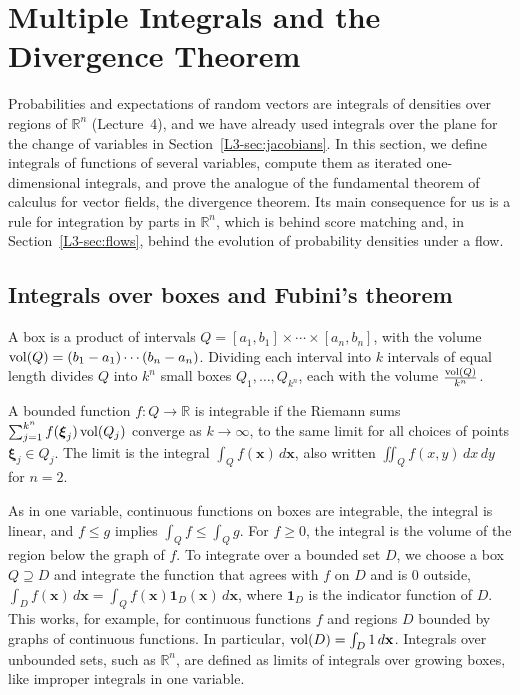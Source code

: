 \section{Multiple Integrals and the Divergence Theorem}\label{L3-sec:integrals}

Probabilities and expectations of random vectors are integrals of densities over regions of $\mathbb{R}^n$ (Lecture~4), and we have already used integrals over the plane for the change of variables in Section~\ref{L3-sec:jacobians}. In this section, we define integrals of functions of several variables, compute them as iterated one-dimensional integrals, and prove the analogue of the fundamental theorem of calculus for vector fields, the divergence theorem. Its main consequence for us is a rule for integration by parts in $\mathbb{R}^n$, which is behind score matching and, in Section~\ref{L3-sec:flows}, behind the evolution of probability densities under a flow.

\subsection{Integrals over boxes and Fubini's theorem}

A box is a product of intervals $Q = [a_1, b_1] \times \cdots \times [a_n, b_n]$, with the volume $\operatorname{vol}(Q) = (b_1 - a_1)\cdots(b_n - a_n)$. Dividing each interval into $k$ intervals of equal length divides $Q$ into $k^n$ small boxes $Q_1, \ldots, Q_{k^n}$, each with the volume $\frac{\operatorname{vol}(Q)}{k^n}$.

\begin{definition}\label{L3-def:multiple-integral}
    A bounded function $f: Q \to \mathbb{R}$ is integrable if the Riemann sums $\sum_{j=1}^{k^n} f(\boldsymbol{\xi}_j)\operatorname{vol}(Q_j)$ converge as $k \to \infty$, to the same limit for all choices of points $\boldsymbol{\xi}_j \in Q_j$. The limit is the integral $\int_Q f(\mathbf{x})\, d\mathbf{x}$, also written $\iint_Q f(x, y)\, dx\, dy$ for $n = 2$.
\end{definition}

As in one variable, continuous functions on boxes are integrable, the integral is linear, and $f \leq g$ implies $\int_Q f \leq \int_Q g$. For $f \geq 0$, the integral is the volume of the region below the graph of $f$. To integrate over a bounded set $D$, we choose a box $Q \supseteq D$ and integrate the function that agrees with $f$ on $D$ and is $0$ outside, $\int_D f(\mathbf{x})\, d\mathbf{x} = \int_Q f(\mathbf{x})\mathbf{1}_D(\mathbf{x})\, d\mathbf{x}$, where $\mathbf{1}_D$ is the indicator function of $D$. This works, for example, for continuous functions $f$ and regions $D$ bounded by graphs of continuous functions. In particular, $\operatorname{vol}(D) = \int_D 1\, d\mathbf{x}$. Integrals over unbounded sets, such as $\mathbb{R}^n$, are defined as limits of integrals over growing boxes, like improper integrals in one variable.

